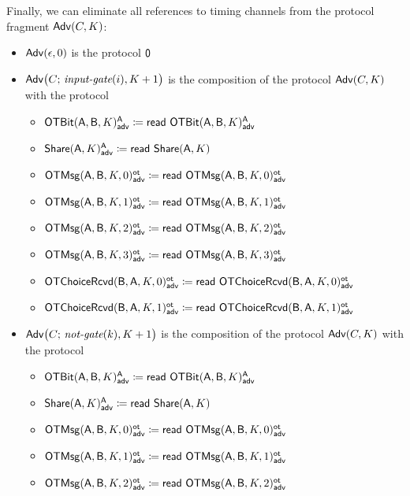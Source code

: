 \noindent Finally, we can eliminate all references to timing channels from the protocol fragment $\Adv(C,K)$:

\begin{itemize}
\item $\Adv(\epsilon,0)$ is the protocol $\zero$
\item $\Adv\big(C; \, \inputgate(i),K+1\big)$ is the composition of the protocol $\Adv(C,K)$ with the protocol
\begin{itemize}
\item {\color{blue} $\LeakOTBit(\A,\B,K)^\A_\adv \coloneqq \read{\LeakOTBit(\A,\B,K)^\A_\adv}$}
\item {\color{blue} $\LeakShare(\A,K)^\A_\adv \coloneqq \read{\Share(\A,K)}$}\medskip
\item {\color{blue} $\LeakOTMsg(\A,\B,K,0)^\ot_\adv \coloneqq \read{\LeakOTMsg(\A,\B,K,0)^\ot_\adv}$}
\item {\color{blue} $\LeakOTMsg(\A,\B,K,1)^\ot_\adv \coloneqq \read{\LeakOTMsg(\A,\B,K,1)^\ot_\adv}$}
\item {\color{blue} $\LeakOTMsg(\A,\B,K,2)^\ot_\adv \coloneqq \read{\LeakOTMsg(\A,\B,K,2)^\ot_\adv}$}
\item {\color{blue} $\LeakOTMsg(\A,\B,K,3)^\ot_\adv \coloneqq \read{\LeakOTMsg(\A,\B,K,3)^\ot_\adv}$}\medskip
\item {\color{blue} $\LeakOTChoiceRcvd(\B,\A,K,0)^\ot_\adv \coloneqq \read{\LeakOTChoiceRcvd(\B,\A,K,0)^\ot_\adv}$}
\item {\color{blue} $\LeakOTChoiceRcvd(\B,\A,K,1)^\ot_\adv \coloneqq \read{\LeakOTChoiceRcvd(\B,\A,K,1)^\ot_\adv}$}
\end{itemize}
\item $\Adv\big(C; \, \notgate(k),K+1\big)$ is the composition of the protocol $\Adv(C,K)$ with the protocol
\begin{itemize}
\item {\color{blue} $\LeakOTBit(\A,\B,K)^\A_\adv \coloneqq \read{\LeakOTBit(\A,\B,K)^\A_\adv}$}
\item {\color{blue} $\LeakShare(\A,K)^\A_\adv \coloneqq \read{\Share(\A,K)}$}\medskip
\item {\color{blue} $\LeakOTMsg(\A,\B,K,0)^\ot_\adv \coloneqq \read{\LeakOTMsg(\A,\B,K,0)^\ot_\adv}$}
\item {\color{blue} $\LeakOTMsg(\A,\B,K,1)^\ot_\adv \coloneqq \read{\LeakOTMsg(\A,\B,K,1)^\ot_\adv}$}
\item {\color{blue} $\LeakOTMsg(\A,\B,K,2)^\ot_\adv \coloneqq \read{\LeakOTMsg(\A,\B,K,2)^\ot_\adv}$}

\end{itemize}
\end{itemize}
